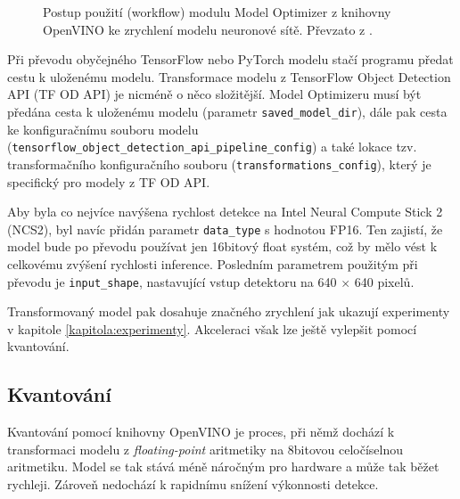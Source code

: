 \begin{figure}[H]
  \begin{center}
  \label{obrazek:moworkflow}
  \caption[]{Postup použití (workflow) modulu Model Optimizer z knihovny OpenVINO ke zrychlení modelu neuronové sítě. Převzato z \cite{modeloptimizer}.}
  \end{center}
\end{figure}

Při převodu obyčejného TensorFlow nebo PyTorch modelu stačí programu předat cestu k uloženému modelu. Transformace modelu z TensorFlow Object Detection API (TF OD API) je nicméně o něco složitější. Model Optimizeru musí být předána cesta k uloženému modelu (parametr \texttt{saved\_model\_dir}), dále pak cesta ke konfiguračnímu souboru modelu (\texttt{tensorflow\_object\_detection\_api\_pipeline\_config}) a také lokace tzv. transformačního konfiguračního souboru (\texttt{transformations\_config}), který je specifický pro modely z TF OD API.

Aby byla co nejvíce navýšena rychlost detekce na Intel Neural Compute Stick 2 (NCS2), byl navíc přidán parametr \texttt{data\_type} s hodnotou FP16. Ten zajistí, že model bude po převodu používat jen 16bitový float systém, což by mělo vést k celkovému zvýšení rychlosti inference. Posledním parametrem použitým při převodu je \texttt{input\_shape}, nastavující vstup detektoru na 640 $\times$ 640 pixelů.

Transformovaný model pak dosahuje značného zrychlení jak ukazují experimenty v kapitole \ref{kapitola:experimenty}. Akceleraci však lze ještě vylepšit pomocí kvantování.

\subsection*{Kvantování}
Kvantování \cite{quantization} pomocí knihovny OpenVINO je proces, při němž dochází k transformaci modelu z \emph{floating-point} aritmetiky na 8bitovou celočíselnou aritmetiku. Model se tak stává méně náročným pro hardware a může tak běžet rychleji. Zároveň nedochází k rapidnímu snížení výkonnosti detekce.

